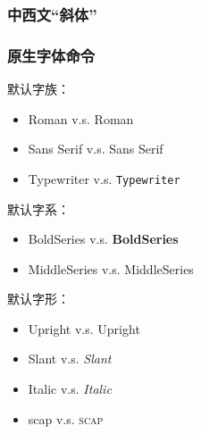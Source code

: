 \documentclass[twoside]{ctexart} %
\begin{document}
        \subsubsection{中西文“斜体”}
        \subsubsection{原生字体命令}
        
            默认字族：\familydefault %
            \begin{itemize}
                \item Roman v.s. \textrm{Roman} %
                \item Sans Serif v.s. \textsf{Sans Serif} %
                \item Typewriter v.s. \texttt{Typewriter} %
            \end{itemize}
        
            默认字系：\seriesdefault %
            \begin{itemize}
                \item BoldSeries v.s. \textbf{BoldSeries} %
                \item MiddleSeries v.s. \textmd{MiddleSeries} %
            \end{itemize}

            默认字形：\shapedefault %
            \begin{itemize}
                \item Upright v.s. \textup{Upright} %
                \item Slant v.s. \textsl{Slant} %
                \item Italic v.s. \textit{Italic} %
                \item scap v.s. \textsc{scap} %
            \end{itemize}
\end{document}
